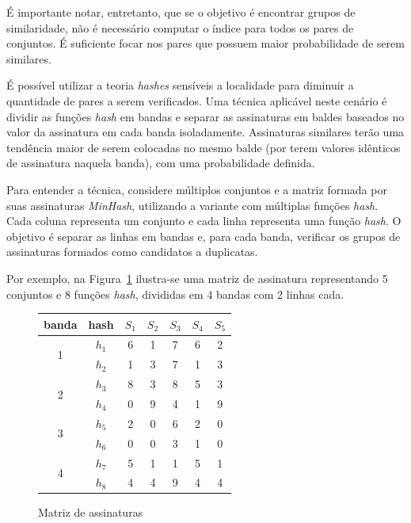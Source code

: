 É importante notar, entretanto, que se o objetivo é encontrar grupos de similaridade, não é necessário computar o índice para todos os pares de conjuntos. É suficiente focar nos pares que possuem maior probabilidade de serem similares.

É possível utilizar a teoria \emph{hashes} sensíveis a localidade para diminuir a quantidade de pares a serem verificados. Uma técnica aplicável neste cenário é dividir as funções \emph{hash} em bandas e separar as assinaturas em baldes baseados no valor da assinatura em cada banda isoladamente. Assinaturas similares terão uma tendência maior de serem colocadas no mesmo balde (por terem valores idênticos de assinatura naquela banda), com uma probabilidade definida.

Para entender a técnica, considere múltiplos conjuntos e a matriz formada por suas assinaturas \emph{MinHash}, utilizando a variante com múltiplas funções \emph{hash}. Cada coluna representa um conjunto e cada linha representa uma função \emph{hash}. O objetivo é separar as linhas em bandas e, para cada banda, verificar os grupos de assinaturas formados como candidatos a duplicatas. 

Por exemplo, na Figura~\ref{fig:minhash_signaturematrix} ilustra-se uma matriz de assinatura representando 5 conjuntos e 8 funções \emph{hash}, divididas em 4 bandas com 2 linhas cada.

\begin{figure}[!htbp]
\centering
\begin{tabular}{ c | c || c | c | c | c | c }
 banda & hash & $S_1$ & $S_2$ & $S_3$ & $S_4$ & $S_5$ \\
\hline
  \multirow{2}{*}{1} & $h_1$ & 6   & 1   & 7   & 6  & 2   \\
                     & $h_2$ & 1   & 3   & 7   & 1  & 3   \\
\hline
  \multirow{2}{*}{2} & $h_3$ & 8   & 3   & 8   & 5  & 3   \\
                     & $h_4$ & 0   & 9   & 4   & 1  & 9   \\
\hline
  \multirow{2}{*}{3} & $h_5$ & 2   & 0   & 6   & 2  & 0   \\
                       & $h_6$ & 0   & 0   & 3   & 1  & 0   \\
\hline
  \multirow{2}{*}{4} & $h_7$ & 5   & 1   & 1   & 5  & 1   \\
                     & $h_8$ & 4   & 4   & 9   & 4  & 4   \\
\end{tabular}
\caption{Matriz de assinaturas}
\label{fig:minhash_signaturematrix}
\end{figure}

